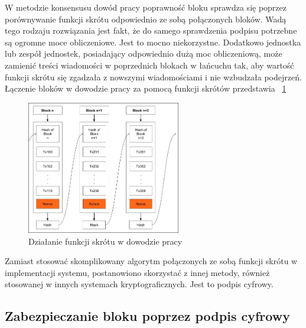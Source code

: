 W metodzie konsensusu dowód pracy poprawność bloku sprawdza się poprzez porównywanie funkcji skrótu odpowiednio ze sobą połączonych bloków. Wadą tego rodzaju rozwiązania jest fakt, że do samego sprawdzenia podpisu potrzebne są ogromne moce obliczeniowe. Jest to mocno niekorzystne. Dodatkowo jednostka lub zespół jednostek, posiadający odpowiednio dużą moc obliczeniową, może zamienić treści wiadomości w poprzednich blokach w łańcuchu tak, aby wartość funkcji skrótu się zgadzała z nowszymi wiadomościami i nie wzbudzała podejrzeń.
Łączenie bloków w dowodzie pracy za pomocą funkcji skrótów przedstawia \figurename{~\ref{fig:ProofOfWorkHash}}
\begin{figure}[h]
    \centering
    \includegraphics[width=0.6\textwidth]{Images/ProofOfWorkHash.jpg}
    \caption{Działanie funkcji skrótu w dowodzie pracy}
    \label{fig:ProofOfWorkHash}
\end{figure}
\newline{}
\newline{}
Zamiast stosować skomplikowany algorytm połączonych ze sobą funkcji skrótu w implementacji systemu, postanowiono skorzystać z innej metody, również stosowanej w innych systemach kryptograficznych. Jest to podpis cyfrowy.

\subsection{Zabezpieczanie bloku poprzez podpis cyfrowy}
\label{ssec:ZabezpieczenieBlokuPodpis}

